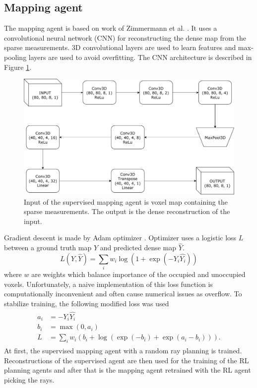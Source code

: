\subsection{Mapping agent}
The mapping agent is based on work of Zimmermann et al. \cite{zimmermann2017}. It uses a convolutional neural network (CNN) for reconstructing the dense map from the sparse measurements. 3D convolutional layers are used to learn features and max-pooling layers are used to avoid overfitting. The CNN architecture is described in Figure \ref{fig:supervised}.
\vspace{3mm}
\begin{figure}[!h]
\centering
\includegraphics[scale=0.6]{fig/supervised.pdf}
\caption[Mapping network architecture]{Input of the supervised mapping agent is voxel map containing the sparse measurements. The output is the dense reconstruction of the input.}
\label{fig:supervised}
\end{figure}

Gradient descent is made by Adam optimizer \cite{adam2014}. Optimizer uses a logistic loss $L$ between a ground truth map $Y$ and predicted dense map $\hat{Y}$.
\begin{equation} \label{eq:loglos}
L(Y, \hat{Y}) = \sum\limits_i w_i \log(1 + \exp(-Y_i \hat{Y_i}))
\end{equation}
where $w$ are weights which balance importance of the occupied and unoccupied voxels.
\pagebreak
Unfortunately, a naive implementation of this loss function is computationally inconvenient and often cause numerical issues as overflow. To stabilize training, the following modified loss was used \cite{matconvnet2015}
\begin{align} 
\begin{split}
a_i &= -Y_i \hat{Y_i} \\
b_i &= \max(0, a_i) \\
L &= \sum\limits_i w_i (b_i + \log(\exp(-b_i) + \exp(a_i-b_i))).
\end{split}
\end{align}
At first, the supervised mapping agent with a random ray planning is trained. Reconstructions of the supervised agent are then used for the training of the RL planning agents and after that is the mapping agent retrained with the RL agent picking the rays.
